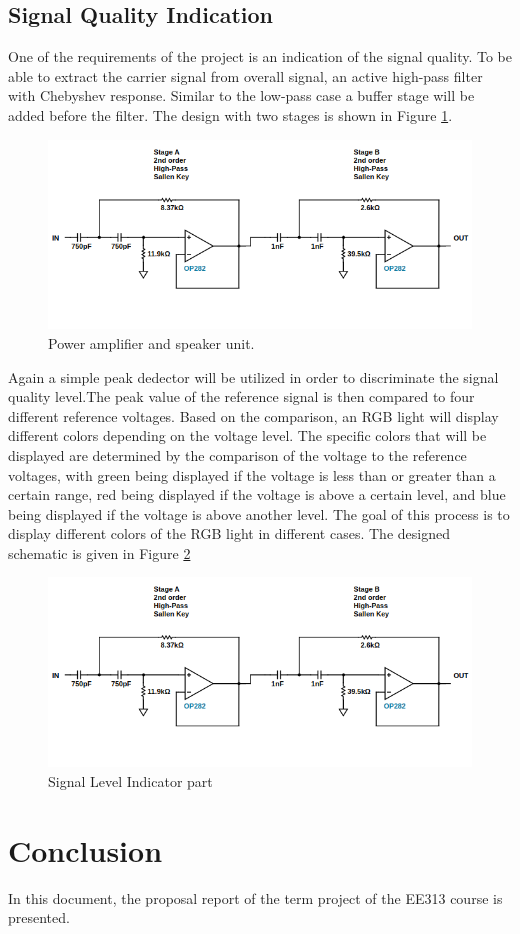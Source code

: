 \documentclass[a4paper,10pt]{IEEEtran}
\begin{document}
\subsection{Signal Quality Indication}
One of the requirements of the project is an indication of the signal quality. To be able to extract the carrier signal from overall signal, an active high-pass filter with Chebyshev response. Similar to the low-pass case a buffer stage will be added before the filter. The design with two stages is shown in Figure \ref*{active_high}.
\begin{figure}[htbp!]
    \centering
    \includegraphics[width = 0.75\linewidth]{active_high_pass_circuit.png}
    \caption{Power amplifier and speaker unit.}
    \label{active_high}    
\end{figure} 

Again a simple peak dedector will be utilized in order to discriminate the signal quality level.The peak value of the reference signal is then compared to four different reference voltages. Based on the comparison, an RGB light will display different colors depending on the voltage level. The specific colors that will be displayed are determined by the comparison of the voltage to the reference voltages, with green being displayed if the voltage is less than or greater than a certain range, red being displayed if the voltage is above a certain level, and blue being displayed if the voltage is above another level. The goal of this process is to display different colors of the RGB light in different cases. The designed schematic is given in Figure \ref*{indicator}
\begin{figure}[htbp!]
    \centering
    \includegraphics[width = 0.75\linewidth]{active_high_pass_circuit.png}
    \caption{Signal Level Indicator part}
    \label{indicator}    
\end{figure} 
\vspace{-0.4cm}
\section{Conclusion}
In this document, the proposal report of the term project of the EE313 course is presented. 
\end{document}
